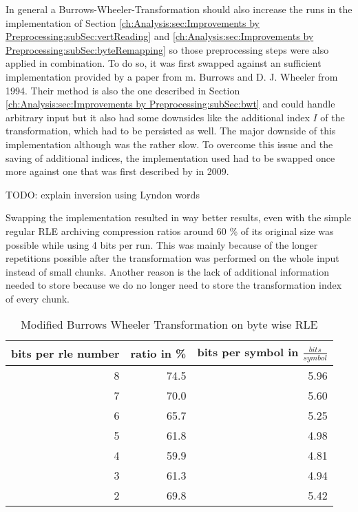 \par{
In general a Burrows-Wheeler-Transformation should also increase the runs in the implementation of Section \ref{ch:Analysis:sec:Improvements by Preprocessing:subSec:vertReading} and \ref{ch:Analysis:sec:Improvements by Preprocessing:subSec:byteRemapping} so those preprocessing steps were also applied in combination. To do so, it was first swapped against an sufficient implementation provided by a paper from m. Burrows and D. J. Wheeler \cite{Burrows94} from 1994. Their method is also the one described in Section \ref{ch:Analysis:sec:Improvements by Preprocessing:subSec:bwt} and could handle arbitrary input but it also had some downsides like the additional index $I$ of the transformation, which had to be persisted as well. The major downside of this implementation although was the rather slow. To overcome this issue and the saving of additional indices, the implementation used had to be swapped once more against one that was first described by \cite{Burrows-linear-time} in 2009.

TODO: explain inversion using Lyndon words
}
\par{
Swapping the implementation resulted in way better results, even with the simple regular RLE archiving compression ratios around 60 \% of its original size was possible while using 4 bits per run. This was mainly because of the longer repetitions possible after the transformation was performed on the whole input instead of small chunks. Another reason is the lack of additional information needed to store because we do no longer need to store the transformation index of every chunk.
	\begin{table}[H]
		\centering
		\begin{tabular}{r|r|r}	
			bits per rle number & ratio in \% & bits per symbol in $\frac{bits}{symbol}$\\
			\hline
			8 & 74.5 & 5.96\\
			7 & 70.0 & 5.60\\
			6 & 65.7 & 5.25\\
			5 & 61.8 & 4.98\\
			4 & 59.9 & 4.81\\
			3 & 61.3 & 4.94\\
			2 & 69.8 & 5.42
		\end{tabular}
		\caption{Modified Burrows Wheeler Transformation on byte wise RLE}
		\label{tab:t12 Modified Burrows Wheeler Transformation on byte wise RLE}
	\end{table}
}


